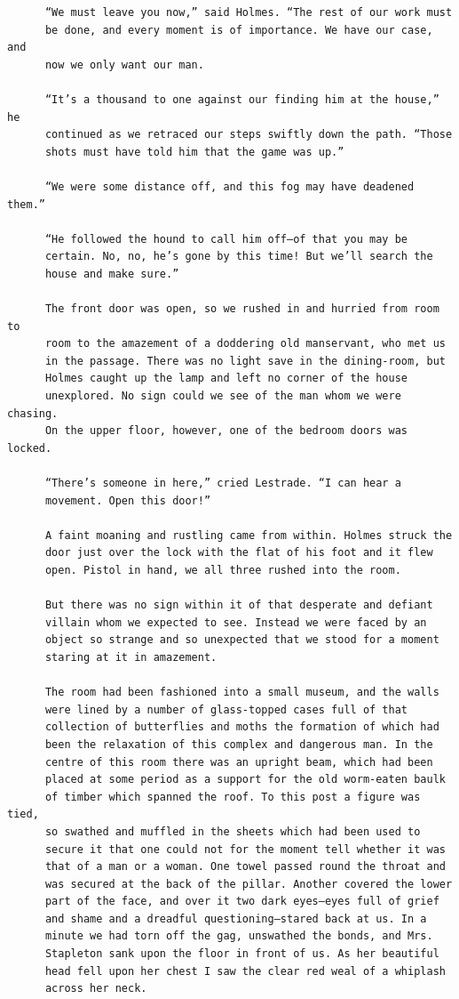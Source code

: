\documentclass{article}
\begin{document}
\begin{verbatim}
      “We must leave you now,” said Holmes. “The rest of our work must
      be done, and every moment is of importance. We have our case, and
      now we only want our man.

      “It’s a thousand to one against our finding him at the house,” he
      continued as we retraced our steps swiftly down the path. “Those
      shots must have told him that the game was up.”

      “We were some distance off, and this fog may have deadened them.”

      “He followed the hound to call him off—of that you may be
      certain. No, no, he’s gone by this time! But we’ll search the
      house and make sure.”

      The front door was open, so we rushed in and hurried from room to
      room to the amazement of a doddering old manservant, who met us
      in the passage. There was no light save in the dining-room, but
      Holmes caught up the lamp and left no corner of the house
      unexplored. No sign could we see of the man whom we were chasing.
      On the upper floor, however, one of the bedroom doors was locked.

      “There’s someone in here,” cried Lestrade. “I can hear a
      movement. Open this door!”

      A faint moaning and rustling came from within. Holmes struck the
      door just over the lock with the flat of his foot and it flew
      open. Pistol in hand, we all three rushed into the room.

      But there was no sign within it of that desperate and defiant
      villain whom we expected to see. Instead we were faced by an
      object so strange and so unexpected that we stood for a moment
      staring at it in amazement.

      The room had been fashioned into a small museum, and the walls
      were lined by a number of glass-topped cases full of that
      collection of butterflies and moths the formation of which had
      been the relaxation of this complex and dangerous man. In the
      centre of this room there was an upright beam, which had been
      placed at some period as a support for the old worm-eaten baulk
      of timber which spanned the roof. To this post a figure was tied,
      so swathed and muffled in the sheets which had been used to
      secure it that one could not for the moment tell whether it was
      that of a man or a woman. One towel passed round the throat and
      was secured at the back of the pillar. Another covered the lower
      part of the face, and over it two dark eyes—eyes full of grief
      and shame and a dreadful questioning—stared back at us. In a
      minute we had torn off the gag, unswathed the bonds, and Mrs.
      Stapleton sank upon the floor in front of us. As her beautiful
      head fell upon her chest I saw the clear red weal of a whiplash
      across her neck.


\end{verbatim}
\end{document}
